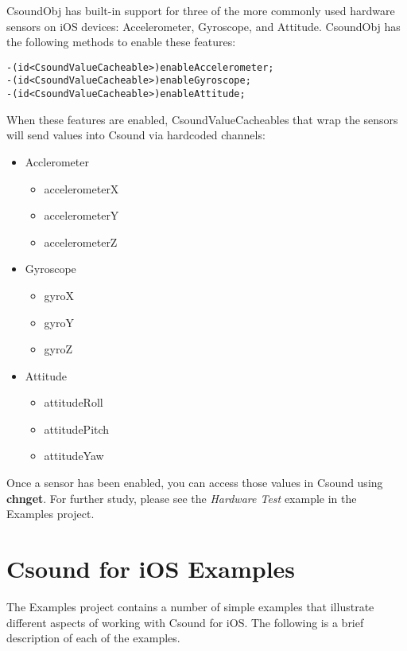 \documentclass[11pt]{article}
\begin{document}
CsoundObj has built-in support for three of the more commonly used hardware sensors on iOS devices: Accelerometer, Gyroscope, and Attitude. CsoundObj has the following methods to enable these features:


\begin{lstlisting}[caption=CsoundObj Hardware Sensor Methods]
-(id<CsoundValueCacheable>)enableAccelerometer;
-(id<CsoundValueCacheable>)enableGyroscope;
-(id<CsoundValueCacheable>)enableAttitude; 
\end{lstlisting}

When these features are enabled, CsoundValueCacheables that wrap the sensors will send values into Csound via hardcoded channels:

\begin{itemize}

\item Acclerometer
\begin{itemize}
\item accelerometerX
\item accelerometerY
\item accelerometerZ
\end{itemize}

\item Gyroscope 
\begin{itemize}
\item gyroX
\item gyroY
\item gyroZ
\end{itemize}

\item Attitude 
\begin{itemize}
\item attitudeRoll
\item attitudePitch
\item attitudeYaw
\end{itemize}

\end{itemize} 

Once a sensor has been enabled, you can access those values in Csound using \textbf{chnget}. For further study, please see the \emph{Hardware Test} example in the Examples project. 


\section{Csound for iOS Examples}

The Examples project contains a number of simple examples that illustrate different aspects of working with Csound for iOS.  The following is a brief description of each of the examples.
\end{document}
